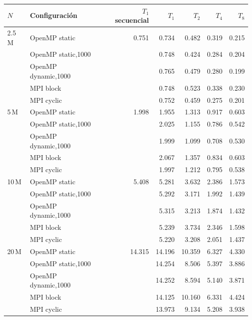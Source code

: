 \begin{tabular}{llrrrrr}
\toprule
$N$ & Configuraci\'on & $T_1$ secuencial & $T_{1}$ & $T_{2}$ & $T_{4}$ & $T_{8}$ \\
\midrule
2.5\,M & OpenMP static & 0.751 & 0.734 & 0.482 & 0.319 & 0.215 \\
 & OpenMP static,1000 &  & 0.748 & 0.424 & 0.284 & 0.204 \\
 & OpenMP dynamic,1000 &  & 0.765 & 0.479 & 0.280 & 0.199 \\
 & MPI block &  & 0.748 & 0.523 & 0.338 & 0.230 \\
 & MPI cyclic &  & 0.752 & 0.459 & 0.275 & 0.201 \\
\midrule
5\,M & OpenMP static & 1.998 & 1.955 & 1.313 & 0.917 & 0.603 \\
 & OpenMP static,1000 &  & 2.025 & 1.155 & 0.786 & 0.542 \\
 & OpenMP dynamic,1000 &  & 1.999 & 1.099 & 0.708 & 0.530 \\
 & MPI block &  & 2.067 & 1.357 & 0.834 & 0.603 \\
 & MPI cyclic &  & 1.997 & 1.212 & 0.795 & 0.538 \\
\midrule
10\,M & OpenMP static & 5.408 & 5.281 & 3.632 & 2.386 & 1.573 \\
 & OpenMP static,1000 &  & 5.292 & 3.171 & 1.992 & 1.439 \\
 & OpenMP dynamic,1000 &  & 5.315 & 3.213 & 1.874 & 1.432 \\
 & MPI block &  & 5.239 & 3.734 & 2.346 & 1.598 \\
 & MPI cyclic &  & 5.220 & 3.208 & 2.051 & 1.437 \\
\midrule
20\,M & OpenMP static & 14.315 & 14.196 & 10.359 & 6.327 & 4.330 \\
 & OpenMP static,1000 &  & 14.254 & 8.506 & 5.397 & 3.886 \\
 & OpenMP dynamic,1000 &  & 14.252 & 8.594 & 5.140 & 3.871 \\
 & MPI block &  & 14.125 & 10.160 & 6.331 & 4.424 \\
 & MPI cyclic &  & 13.973 & 9.134 & 5.208 & 3.938 \\
\bottomrule
\end{tabular}